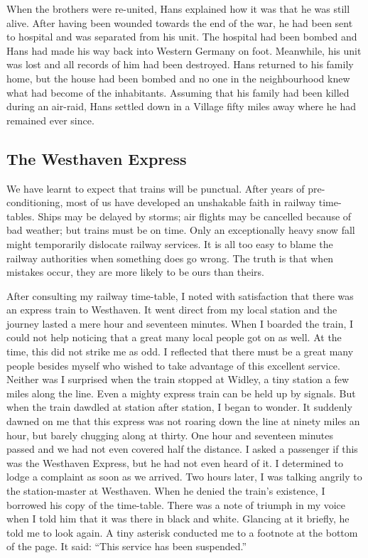 \documentclass[11pt]{article}
\begin{document}
When the brothers were re-united, Hans explained how it was that he was still alive. After having been wounded towards the end of the war, he had been sent to hospital and was separated from his unit. The hospital had been bombed and Hans had made his way back into Western Germany on foot. Meanwhile, his unit was lost and all records of him had been destroyed. Hans returned to his family home, but the house had been bombed and no one in the neighbourhood knew what had become of the inhabitants. Assuming that his family had been killed during an air-raid, Hans settled down in a Village fifty miles away where he had remained ever since. 
\subsection{The Westhaven Express}
\label{sec-1-37}

We have learnt to expect that trains will be punctual. After years of pre-conditioning, most of us have developed an unshakable faith in railway time-tables. Ships may be delayed by storms; air flights may be cancelled because of bad weather; but trains must be on time. Only an exceptionally heavy snow fall might temporarily dislocate railway services. It is all too easy to blame the railway authorities when something does go wrong. The truth is that when mistakes occur, they are more likely to be ours than theirs.

After consulting my railway time-table, I noted with satisfaction that there was an express train to Westhaven. It went direct from my local station and the journey lasted a mere hour and seventeen minutes. When I boarded the train, I could not help noticing that a great many local people got on as well. At the time, this did not strike me as odd. I reflected that there must be a great many people besides myself who wished to take advantage of this excellent service. Neither was I surprised when the train stopped at Widley, a tiny station a few miles along the line. Even a mighty express train can be held up by signals. But when the train dawdled at station after station, I began to wonder. It suddenly dawned on me that this express was not roaring down the line at ninety miles an hour, but barely chugging along at thirty. One hour and seventeen minutes passed and we had not even covered half the distance. I asked a passenger if this was the Westhaven Express, but he had not even heard of it. I determined to lodge a complaint as soon as we arrived. Two hours later, I was talking angrily to the station-master at Westhaven. When he denied the train's existence, I borrowed his copy of the time-table. There was a note of triumph in my voice when I told him that it was there in black and white. Glancing at it briefly, he told me to look again. A tiny asterisk conducted me to a footnote at the bottom of the page. It said: ``This service has been suspended.'' 
\end{document}
